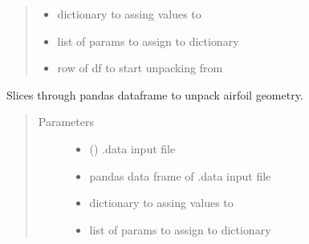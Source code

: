 \documentclass[letterpaper,10pt,english]{sphinxmanual}
\begin{document}
\begin{fulllineitems}
\begin{fulllineitems}
\begin{quote}
\begin{description}
\begin{itemize}
\item {} 
\sphinxAtStartPar
{} \textendash{} dictionary to assing values to

\item {} 
\sphinxAtStartPar
{} \textendash{} list of params to assign to dictionary

\item {} 
\sphinxAtStartPar
{} \textendash{} row of df to start unpacking from

\end{itemize}

\end{description}\end{quote}

\end{fulllineitems}


\begin{fulllineitems}
\label{\detokenize{autoapi/Input/index:Input.Input.update_geom}}
\sphinxAtStartPar
Slices through pandas dataframe to unpack airfoil geometry.
\begin{quote}\begin{description}
\item[{Parameters}] \leavevmode\begin{itemize}
\item {} 
\sphinxAtStartPar
{} () \textendash{} .data input file

\item {} 
\sphinxAtStartPar
{} \textendash{} pandas data frame of .data input file

\item {} 
\sphinxAtStartPar
{} \textendash{} dictionary to assing values to

\item {} 
\sphinxAtStartPar
{} \textendash{} list of params to assign to dictionary


\end{itemize}
\end{description}
\end{quote}
\end{fulllineitems}
\end{fulllineitems}
\end{document}
